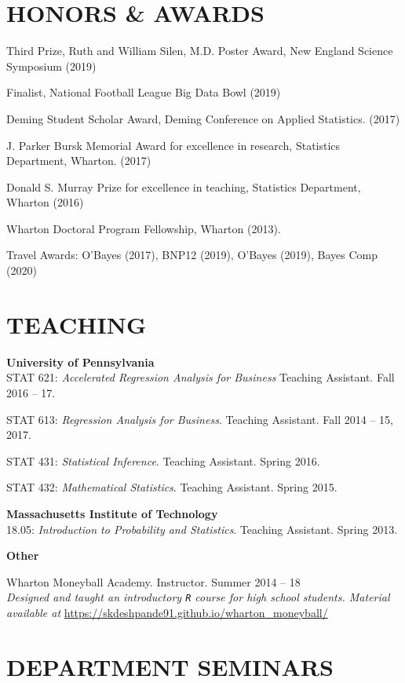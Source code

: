 \documentclass[margin]{res}
\begin{document}
\begin{resume}
\section{HONORS \& AWARDS} 

Third Prize, Ruth and William Silen, M.D. Poster Award, New England Science Symposium (2019)

Finalist, National Football League Big Data Bowl (2019)

Deming Student Scholar Award, Deming Conference on Applied Statistics. (2017)

J. Parker Bursk Memorial Award for excellence in research, Statistics Department, Wharton. (2017)

Donald S. Murray Prize for excellence in teaching, Statistics Department, Wharton (2016)

Wharton Doctoral Program Fellowship, Wharton (2013).

Travel Awards: O'Bayes (2017), BNP12 (2019), O'Bayes (2019), Bayes Comp (2020)

\section{TEACHING}

\textbf{University of Pennsylvania} \\

STAT 621: {\it Accelerated Regression Analysis for Business} Teaching Assistant. Fall 2016 -- 17.

STAT 613: {\it Regression Analysis for Business}. Teaching Assistant. Fall 2014 -- 15, 2017.

STAT 431: {\it Statistical Inference}. Teaching Assistant. Spring 2016.

STAT 432: {\it Mathematical Statistics}. Teaching Assistant. Spring 2015.


\textbf{Massachusetts Institute of Technology} \\

18.05: {\it Introduction to Probability and Statistics}. Teaching Assistant. Spring 2013.

\textbf{Other}

Wharton Moneyball Academy. Instructor. Summer 2014 -- 18 \\
\textit{Designed and taught an introductory \texttt{R} course for high school students. Material available at}  \url{https://skdeshpande91.github.io/wharton_moneyball/}

\section{DEPARTMENT \hspace{0.1in} SEMINARS}


\end{resume}
\end{document}
